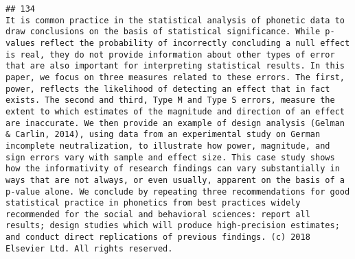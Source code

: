 \documentclass[
  english,
  man]{apa6}
\begin{document}
\begin{verbatim}
## 134                                                                                                                                                                                                                                                                                                                                                                                                                                                                                                                                                                                                                                                                                                                                                                                                                                                                                                                                                                                                                                                                                                                                                                                                                          It is common practice in the statistical analysis of phonetic data to draw conclusions on the basis of statistical significance. While p-values reflect the probability of incorrectly concluding a null effect is real, they do not provide information about other types of error that are also important for interpreting statistical results. In this paper, we focus on three measures related to these errors. The first, power, reflects the likelihood of detecting an effect that in fact exists. The second and third, Type M and Type S errors, measure the extent to which estimates of the magnitude and direction of an effect are inaccurate. We then provide an example of design analysis (Gelman & Carlin, 2014), using data from an experimental study on German incomplete neutralization, to illustrate how power, magnitude, and sign errors vary with sample and effect size. This case study shows how the informativity of research findings can vary substantially in ways that are not always, or even usually, apparent on the basis of a p-value alone. We conclude by repeating three recommendations for good statistical practice in phonetics from best practices widely recommended for the social and behavioral sciences: report all results; design studies which will produce high-precision estimates; and conduct direct replications of previous findings. (c) 2018 Elsevier Ltd. All rights reserved.

\end{verbatim}
\end{document}
